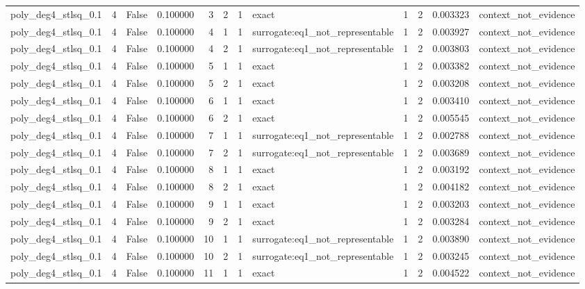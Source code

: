\begin{tabular}{lrrrrrrlrrrl}
poly\_deg4\_stlsq\_0.1 & 4 & False & 0.100000 & 3 & 2 & 1 & exact & 1 & 2 & 0.003323 & context\_not\_evidence \\
poly\_deg4\_stlsq\_0.1 & 4 & False & 0.100000 & 4 & 1 & 1 & surrogate:eq1\_not\_representable & 1 & 2 & 0.003927 & context\_not\_evidence \\
poly\_deg4\_stlsq\_0.1 & 4 & False & 0.100000 & 4 & 2 & 1 & surrogate:eq1\_not\_representable & 1 & 2 & 0.003803 & context\_not\_evidence \\
poly\_deg4\_stlsq\_0.1 & 4 & False & 0.100000 & 5 & 1 & 1 & exact & 1 & 2 & 0.003382 & context\_not\_evidence \\
poly\_deg4\_stlsq\_0.1 & 4 & False & 0.100000 & 5 & 2 & 1 & exact & 1 & 2 & 0.003208 & context\_not\_evidence \\
poly\_deg4\_stlsq\_0.1 & 4 & False & 0.100000 & 6 & 1 & 1 & exact & 1 & 2 & 0.003410 & context\_not\_evidence \\
poly\_deg4\_stlsq\_0.1 & 4 & False & 0.100000 & 6 & 2 & 1 & exact & 1 & 2 & 0.005545 & context\_not\_evidence \\
poly\_deg4\_stlsq\_0.1 & 4 & False & 0.100000 & 7 & 1 & 1 & surrogate:eq1\_not\_representable & 1 & 2 & 0.002788 & context\_not\_evidence \\
poly\_deg4\_stlsq\_0.1 & 4 & False & 0.100000 & 7 & 2 & 1 & surrogate:eq1\_not\_representable & 1 & 2 & 0.003689 & context\_not\_evidence \\
poly\_deg4\_stlsq\_0.1 & 4 & False & 0.100000 & 8 & 1 & 1 & exact & 1 & 2 & 0.003192 & context\_not\_evidence \\
poly\_deg4\_stlsq\_0.1 & 4 & False & 0.100000 & 8 & 2 & 1 & exact & 1 & 2 & 0.004182 & context\_not\_evidence \\
poly\_deg4\_stlsq\_0.1 & 4 & False & 0.100000 & 9 & 1 & 1 & exact & 1 & 2 & 0.003203 & context\_not\_evidence \\
poly\_deg4\_stlsq\_0.1 & 4 & False & 0.100000 & 9 & 2 & 1 & exact & 1 & 2 & 0.003284 & context\_not\_evidence \\
poly\_deg4\_stlsq\_0.1 & 4 & False & 0.100000 & 10 & 1 & 1 & surrogate:eq1\_not\_representable & 1 & 2 & 0.003890 & context\_not\_evidence \\
poly\_deg4\_stlsq\_0.1 & 4 & False & 0.100000 & 10 & 2 & 1 & surrogate:eq1\_not\_representable & 1 & 2 & 0.003245 & context\_not\_evidence \\
poly\_deg4\_stlsq\_0.1 & 4 & False & 0.100000 & 11 & 1 & 1 & exact & 1 & 2 & 0.004522 & context\_not\_evidence \\

\end{tabular}

